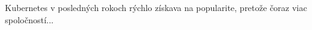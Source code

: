 \documentclass{article}
\begin{document}
Kubernetes v posledných rokoch rýchlo získava na popularite, pretože čoraz viac spoločností...
\end{document}
